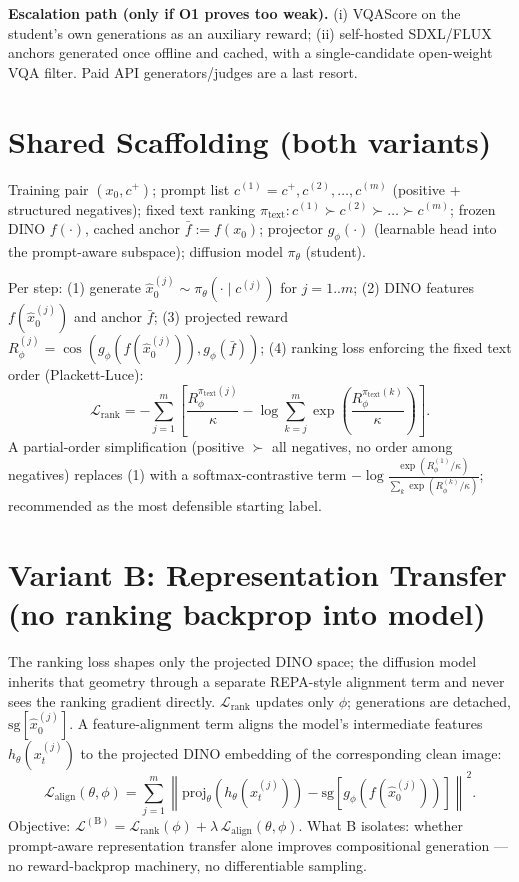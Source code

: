 \documentclass[11pt]{article}
\begin{document}
\textbf{Escalation path (only if O1 proves too weak).} (i) VQAScore on the student's own generations as an auxiliary reward; (ii) self-hosted SDXL/FLUX anchors generated once offline and cached, with a single-candidate open-weight VQA filter. Paid API generators/judges are a last resort.

\section{Shared Scaffolding (both variants)}
Training pair $(x_0, c^+)$; prompt list $c^{(1)} = c^+, c^{(2)}, \dots, c^{(m)}$ (positive + structured negatives); fixed text ranking $\pi_{\text{text}} : c^{(1)} \succ c^{(2)} \succ \dots \succ c^{(m)}$; frozen DINO $f(\cdot)$, cached anchor $\bar{f} := f(x_0)$; projector $g_\phi(\cdot)$ (learnable head into the prompt-aware subspace); diffusion model $\pi_\theta$ (student).

Per step: (1) generate $\hat{x}_0^{(j)} \sim \pi_\theta(\cdot \mid c^{(j)})$ for $j = 1..m$; (2) DINO features $f(\hat{x}_0^{(j)})$ and anchor $\bar{f}$; (3) projected reward $R_\phi^{(j)} = \cos(g_\phi(f(\hat{x}_0^{(j)})), g_\phi(\bar{f}))$; (4) ranking loss enforcing the fixed text order (Plackett-Luce):
\begin{equation}
\mathcal{L}_{\text{rank}} = -\sum_{j=1}^m \left[ \frac{R_\phi^{\pi_{\text{text}}(j)}}{\kappa} - \log \sum_{k=j}^m \exp\left( \frac{R_\phi^{\pi_{\text{text}}(k)}}{\kappa} \right) \right].
\end{equation}
A partial-order simplification (positive $\succ$ all negatives, no order among negatives) replaces (1) with a softmax-contrastive term $-\log \frac{\exp(R_\phi^{(1)}/\kappa)}{\sum_k \exp(R_\phi^{(k)}/\kappa)}$; recommended as the most defensible starting label.

\section{Variant B: Representation Transfer (no ranking backprop into model)}
The ranking loss shapes only the projected DINO space; the diffusion model inherits that geometry through a separate REPA-style alignment term and never sees the ranking gradient directly.
$\mathcal{L}_{\text{rank}}$ updates only $\phi$; generations are detached, $\text{sg}[\hat{x}_0^{(j)}]$. A feature-alignment term aligns the model's intermediate features $h_\theta(x_t^{(j)})$ to the projected DINO embedding of the corresponding clean image:
\begin{equation}
\mathcal{L}_{\text{align}}(\theta, \phi) = \sum_{j=1}^m \left\| \text{proj}_\theta(h_\theta(x_t^{(j)})) - \text{sg}[g_\phi(f(\hat{x}_0^{(j)}))] \right\|^2 .
\end{equation}
Objective: $\mathcal{L}^{(\text{B})} = \mathcal{L}_{\text{rank}}(\phi) + \lambda\, \mathcal{L}_{\text{align}}(\theta, \phi)$.
What B isolates: whether prompt-aware representation transfer alone improves compositional generation --- no reward-backprop machinery, no differentiable sampling.
\end{document}
